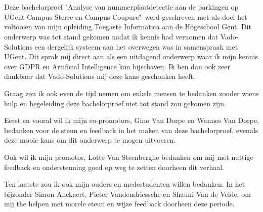 
\chapter*{}
\label{ch:voorwoord}


Deze bachelorproef "Analyse van nummerplaatdetectie aan de parkingen op UGent Campus Sterre en Campus Coupure"\ werd geschreven met als doel het voltooien van mijn opleiding Toegaste Informatica aan de Hogeschool Gent. Dit onderwerp was tot stand gekomen nadat ik kennis had vernomen dat Vado-Solutions een dergelijk systeem aan het overwegen was in samenspraak met UGent. Dit sprak mij direct aan als een uitdagend onderwerp waar ik mijn kennis over GDPR en Artificial Intelligence kon bijschaven. Ik ben dan ook zeer dankbaar dat Vado-Solutions mij deze kans geschonken heeft.

Graag zou ik ook even de tijd nemen om enkele mensen te bedanken zonder wiens hulp en begeleiding deze bachelorproef niet tot stand zou gekomen zijn.

Eerst en vooral wil ik mijn co-promotors, Gino Van Dorpe en Wannes Van Dorpe, bedanken voor de steun en feedback in het maken van deze bachelorproef, evenals deze mooie kans om dit onderwerp te mogen uitvoeren.

Ook wil ik mijn promotor, Lotte Van Steenberghe bedanken om mij met nuttige feedback en ondersteuning goed op weg te zetten doorheen dit verhaal.

Ten laatste zou ik ook mijn ouders en medestudenten willen bedanken. In het bijzonder Simon Anckaert, Pieter Vandendriessche en Shauni Van de Velde, om mij the helpen met morele steun en wijze feedback doorheen deze periode.